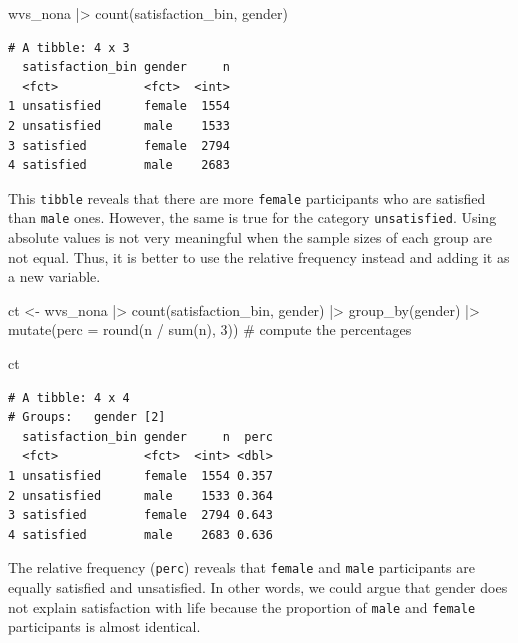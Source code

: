 \documentclass[
  letterpaper,
]{krantz}
\makeatletter
\newenvironment{Shaded}{\begin{snugshade}}{\end{snugshade}}
\newcommand{\AttributeTok}[1]{\textcolor[rgb]{0.40,0.45,0.13}{#1}}
\newcommand{\CommentTok}[1]{\textcolor[rgb]{0.37,0.37,0.37}{#1}}
\newcommand{\DecValTok}[1]{\textcolor[rgb]{0.68,0.00,0.00}{#1}}
\newcommand{\FunctionTok}[1]{\textcolor[rgb]{0.28,0.35,0.67}{#1}}
\newcommand{\NormalTok}[1]{\textcolor[rgb]{0.00,0.23,0.31}{#1}}
\newcommand{\OtherTok}[1]{\textcolor[rgb]{0.00,0.23,0.31}{#1}}
\newcommand{\SpecialCharTok}[1]{\textcolor[rgb]{0.37,0.37,0.37}{#1}}
\newenvironment{kframe}{%
\medskip{}
\setlength{\fboxsep}{.8em}
 \def\at@end@of@kframe{}%
 \ifinner\ifhmode%
  \def\at@end@of@kframe{\end{minipage}}%
  \begin{minipage}{\columnwidth}%
 \fi\fi%
 \def\FrameCommand##1{\hskip\@totalleftmargin \hskip-\fboxsep
 \colorbox{shadecolor}{##1}\hskip-\fboxsep
     \hskip-\linewidth \hskip-\@totalleftmargin \hskip\columnwidth}%
 \MakeFramed {\advance\hsize-\width
   \@totalleftmargin\z@ \linewidth\hsize
   \@setminipage}}%
 {\par\unskip\endMakeFramed%
 \at@end@of@kframe}
\renewenvironment{Shaded}{\begin{kframe}}{\end{kframe}}
\makeatother
\begin{document}
\begin{Shaded}
\begin{Highlighting}[]
\NormalTok{wvs\_nona }\SpecialCharTok{|\textgreater{}} \FunctionTok{count}\NormalTok{(satisfaction\_bin, gender)}
\end{Highlighting}
\end{Shaded}

\begin{verbatim}
# A tibble: 4 x 3
  satisfaction_bin gender     n
  <fct>            <fct>  <int>
1 unsatisfied      female  1554
2 unsatisfied      male    1533
3 satisfied        female  2794
4 satisfied        male    2683
\end{verbatim}

This \texttt{tibble} reveals that there are more \texttt{female}
participants who are satisfied than \texttt{male} ones. However, the
same is true for the category \texttt{unsatisfied}. Using absolute
values is not very meaningful when the sample sizes of each group are
not equal. Thus, it is better to use the relative frequency instead and
adding it as a new variable.

\begin{Shaded}
\begin{Highlighting}[]
\NormalTok{ct }\OtherTok{\textless{}{-}}
\NormalTok{  wvs\_nona }\SpecialCharTok{|\textgreater{}}
  \FunctionTok{count}\NormalTok{(satisfaction\_bin, gender) }\SpecialCharTok{|\textgreater{}}
  \FunctionTok{group\_by}\NormalTok{(gender) }\SpecialCharTok{|\textgreater{}}
  \FunctionTok{mutate}\NormalTok{(}\AttributeTok{perc =} \FunctionTok{round}\NormalTok{(n }\SpecialCharTok{/} \FunctionTok{sum}\NormalTok{(n), }\DecValTok{3}\NormalTok{)) }\CommentTok{\# compute the percentages}

\NormalTok{ct}
\end{Highlighting}
\end{Shaded}

\begin{verbatim}
# A tibble: 4 x 4
# Groups:   gender [2]
  satisfaction_bin gender     n  perc
  <fct>            <fct>  <int> <dbl>
1 unsatisfied      female  1554 0.357
2 unsatisfied      male    1533 0.364
3 satisfied        female  2794 0.643
4 satisfied        male    2683 0.636
\end{verbatim}

The relative frequency (\texttt{perc}) reveals that \texttt{female} and
\texttt{male} participants are equally satisfied and unsatisfied. In
other words, we could argue that gender does not explain satisfaction
with life because the proportion of \texttt{male} and \texttt{female}
participants is almost identical.
\end{document}
